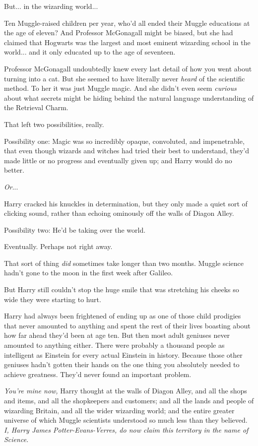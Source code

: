 But... in the wizarding world...

Ten Muggle-raised children per year, who'd all ended their Muggle educations at the age of eleven? And Professor McGonagall might be biased, but she had claimed that Hogwarts was the largest and most eminent wizarding school in the world... and it only educated up to the age of seventeen.

Professor McGonagall undoubtedly knew every last detail of how you went about turning into a cat. But she seemed to have literally never \emph{heard} of the scientific method. To her it was just Muggle magic. And she didn't even seem \emph{curious} about what secrets might be hiding behind the natural language understanding of the Retrieval Charm.

That left two possibilities, really.

Possibility one: Magic was so incredibly opaque, convoluted, and impenetrable, that even though wizards and witches had tried their best to understand, they'd made little or no progress and eventually given up; and Harry would do no better.

\emph{Or}...

Harry cracked his knuckles in determination, but they only made a quiet sort of clicking sound, rather than echoing ominously off the walls of Diagon Alley.

Possibility two: He'd be taking over the world.

Eventually. Perhaps not right away.

That sort of thing \emph{did} sometimes take longer than two months. Muggle science hadn't gone to the moon in the first week after Galileo.

But Harry still couldn't stop the huge smile that was stretching his cheeks so wide they were starting to hurt.

Harry had always been frightened of ending up as one of those child prodigies that never amounted to anything and spent the rest of their lives boasting about how far ahead they'd been at age ten. But then most adult geniuses never amounted to anything either. There were probably a thousand people as intelligent as Einstein for every actual Einstein in history. Because those other geniuses hadn't gotten their hands on the one thing you absolutely needed to achieve greatness. They'd never found an important problem.

\emph{You're mine now,} Harry thought at the walls of Diagon Alley, and all the shops and items, and all the shopkeepers and customers; and all the lands and people of wizarding Britain, and all the wider wizarding world; and the entire greater universe of which Muggle scientists understood so much less than they believed. \emph{I, Harry James Potter-Evans-Verres, do now claim this territory in the name of Science.}


